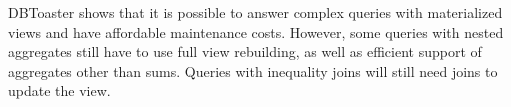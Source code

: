 DBToaster shows that it is possible to answer complex queries with materialized views and have affordable maintenance costs.
However, some queries with nested aggregates still have to use full view rebuilding, as well as efficient support of aggregates other than sums.
Queries with inequality joins will still need joins to update the view.




%
%
